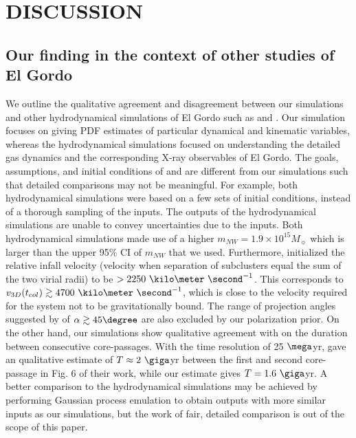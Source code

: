 \section{DISCUSSION}
\subsection{Our finding in the context of other studies of El Gordo}
We outline the qualitative agreement and disagreement between our
simulations and other hydrodynamical simulations of El Gordo such as
\cite{Donnert13} and \cite{Molnar14}. Our simulation focuses on giving PDF
estimates of particular dynamical and kinematic variables, whereas the
hydrodynamical simulations focused on understanding the detailed gas dynamics
and the corresponding X-ray observables of El Gordo. The goals,
assumptions, and initial conditions of \cite{Donnert13} and \cite{Molnar14}
are different from our simulations such that detailed comparisons may not
be meaningful. 
For example, both hydrodynamical simulations were based on a few sets of initial
conditions, instead of a thorough sampling of the inputs. The outputs of
the hydrodynamical simulations are unable to convey uncertainties due to
the inputs. Both hydrodynamical simulations made use of a higher $m_{NW} =
1.9 \times 10^{15} M_{\sun}$ which is larger than the upper 95\% CI of $m_{NW}$
that we used. Furthermore, \cite{Molnar14} initialized the relative infall velocity (velocity when separation of subclusters equal the sum
of the two virial radii) to be $> 2250~\kilo \meter~
\second^{-1}$. This corresponds to $v_{3D}(t_{col}) \gtrsim 4700~\kilo
\meter~\second^{-1}$, which is close to the velocity required for the
system not to be gravitationally bound. The range of projection angles suggested by
\cite{Molnar14} of $\alpha \gtrsim 45\degree$ are also excluded by our polarization prior.  On the other hand, our simulations show qualitative agreement with
\cite{Donnert13} on the duration between consecutive core-passages. With
the time resolution of 25 $\mega$yr, \cite{Donnert13} gave an
qualitative estimate of  $T\approx 2~\giga$yr between the first and second
core-passage in Fig. 6 of their work, while our estimate gives $T
= 1.6~\giga$yr.  A better comparison to the hydrodynamical simulations
may be achieved by performing Gaussian process emulation to obtain outputs
with more similar inputs as our simulations, but the work of fair, detailed
comparison is out of the scope of this paper. 

